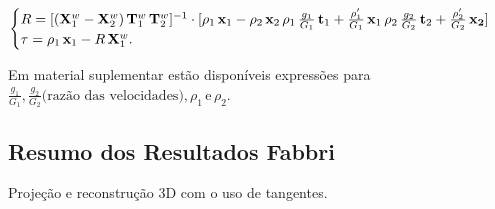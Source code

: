 \begin{center}
$\begin{cases}
R = [({\bf X}_1^w - {\bf X}_2^w)\,{\bf T}_1^w\,{\bf T}_2^w]^{-1} \cdot [\rho_1\,{\bf x}_1 - \rho_2\,{\bf x}_2\,\rho_1\,\frac{g_1}{G_1}\,{\bf t}_1 + \frac{\rho_1'}{G_1}\,{\bf x}_1\,\rho_2\,\frac{g_2}{G_2}\,{\bf t}_2 + \frac{\rho_2'}{G_2}\,{\bf x_2}]\\
\tau = \rho_1\,{\bf x}_1 - R\,{\bf X}_1^w.
\end{cases}$
\end{center}

Em material suplementar estão disponíveis expressões para $\frac{g_1}{G_1}, \frac{g_2}{G_2}\text{(razão das velocidades)}, \rho_1 \,\text{e}\, \rho_2$. 


\subsection{Resumo dos Resultados Fabbri}
Projeção e reconstrução 3D com o uso de tangentes.

